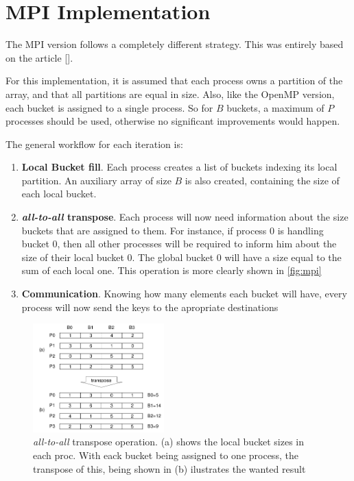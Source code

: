 \section{MPI Implementation}
\label{sec:mpi}

The MPI version follows a completely different strategy. This was entirely based on the article [\cite{paper}].

For this implementation, it is assumed that each process owns a partition of the array, and that all partitions are equal in size. Also, like the OpenMP version, each bucket is assigned to a single process. So for $B$ buckets, a maximum of $P$ processes should be used, otherwise no significant improvements would happen.

The general workflow for each iteration is:

\begin{enumerate}
	\item \textbf{Local Bucket fill}. Each process creates a list of buckets indexing its local partition. An auxiliary array of size $B$ is also created, containing the size of each local bucket.

	\item \textbf{\emph{all-to-all} transpose}. Each process will now need information about the size buckets that are assigned to them. For instance, if process 0 is handling bucket 0, then all other processes will be required to inform him about the size of their local bucket 0. The global bucket 0 will have a size equal to the sum of each local one. This operation is more clearly shown in \autoref{fig:mpi}

	\item \textbf{Communication}. Knowing how many elements each bucket will have, every process will now send the keys to the apropriate destinations
\end{enumerate}

\begin{figure}[!htpb]
	\begin{center}
		\includegraphics[width=0.45\textwidth]{images/mpi}
	\end{center}
	\caption{\emph{all-to-all} transpose operation. (a) shows the local bucket sizes in each proc. With eack bucket being assigned to one process, the transpose of this, being shown in (b) ilustrates the wanted result}
	\label{fig:mpi}
\end{figure}

